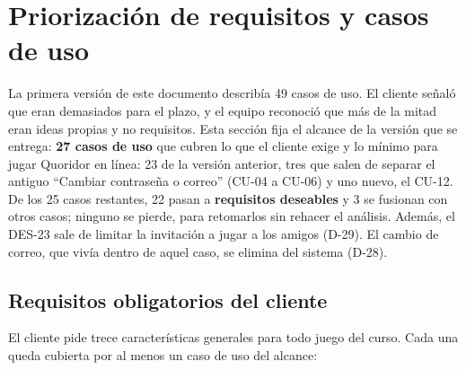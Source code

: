 \section*{Priorización de requisitos y casos de uso}

La primera versión de este documento describía 49 casos de uso. El cliente señaló que eran demasiados para el plazo, y el equipo reconoció que más de la mitad eran ideas propias y no requisitos. Esta sección fija el alcance de la versión que se entrega: \textbf{27 casos de uso} que cubren lo que el cliente exige y lo mínimo para jugar Quoridor en línea: 23 de la versión anterior, tres que salen de separar el antiguo ``Cambiar contraseña o correo'' (\mbox{CU-04} a \mbox{CU-06}) y uno nuevo, el \mbox{CU-12}. De los 25 casos restantes, 22 pasan a \textbf{requisitos deseables} y 3 se fusionan con otros casos; ninguno se pierde, para retomarlos sin rehacer el análisis. Además, el \mbox{DES-23} sale de limitar la invitación a jugar a los amigos (\mbox{D-29}). El cambio de correo, que vivía dentro de aquel caso, se elimina del sistema (\mbox{D-28}).

\subsection*{Requisitos obligatorios del cliente}

El cliente pide trece características generales para todo juego del curso. Cada una queda cubierta por al menos un caso de uso del alcance:

